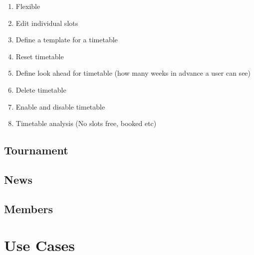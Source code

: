 \begin{enumerate}
\item Flexible 
\item Edit individual slots
\item Define a template for a timetable
\item Reset timetable
\item Define look ahead for timetable (how many weeks in advance a user can see)
\item Delete timetable
\item Enable and disable timetable
\item Timetable analysis (No slots free, booked etc)
\end{enumerate}

\subsection{Tournament}

\subsection{News}

\subsection{Members}

\section{Use Cases}

